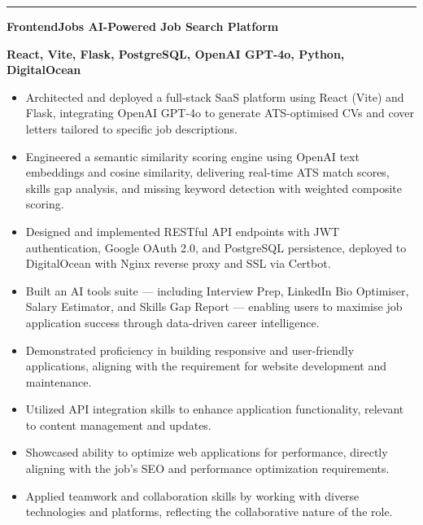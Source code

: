 \documentclass[11pt, a4paper]{article}
\begin{document}
\vspace{8pt}
\noindent%
{\color{DKGreen}\rule{4pt}{14pt}}\hspace{6pt}%
\textcolor{DarkTxt}{\textbf{\large FrontendJobs AI-Powered Job Search Platform}}\par
\vspace{1pt}
\noindent\hspace{10pt}\textcolor{DKGreen}{\textbf{\small React, Vite, Flask, PostgreSQL, OpenAI GPT-4o, Python, DigitalOcean}}
\vspace{2pt}
\begin{itemize}
  \item \textcolor{MidTxt}{Architected and deployed a full-stack SaaS platform using React (Vite) and Flask, integrating OpenAI GPT-4o to generate ATS-optimised CVs and cover letters tailored to specific job descriptions.}
  \item \textcolor{MidTxt}{Engineered a semantic similarity scoring engine using OpenAI text embeddings and cosine similarity, delivering real-time ATS match scores, skills gap analysis, and missing keyword detection with weighted composite scoring.}
  \item \textcolor{MidTxt}{Designed and implemented RESTful API endpoints with JWT authentication, Google OAuth 2.0, and PostgreSQL persistence, deployed to DigitalOcean with Nginx reverse proxy and SSL via Certbot.}
  \item \textcolor{MidTxt}{Built an AI tools suite — including Interview Prep, LinkedIn Bio Optimiser, Salary Estimator, and Skills Gap Report — enabling users to maximise job application success through data-driven career intelligence.}
  \item \textcolor{MidTxt}{Demonstrated proficiency in building responsive and user-friendly applications, aligning with the requirement for website development and maintenance.}
  \item \textcolor{MidTxt}{Utilized API integration skills to enhance application functionality, relevant to content management and updates.}
  \item \textcolor{MidTxt}{Showcased ability to optimize web applications for performance, directly aligning with the job's SEO and performance optimization requirements.}
  \item \textcolor{MidTxt}{Applied teamwork and collaboration skills by working with diverse technologies and platforms, reflecting the collaborative nature of the role.}
\end{itemize}
\vspace{2pt}
\end{document}
